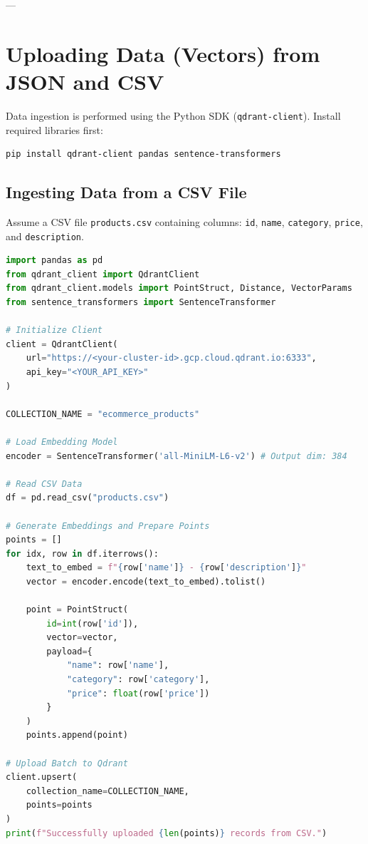 \documentclass[11pt,a4paper]{article}
\begin{document}
---

\section{Uploading Data (Vectors) from JSON and CSV}

Data ingestion is performed using the Python SDK (\texttt{qdrant-client}). Install required libraries first:
\begin{lstlisting}[language=bash]
pip install qdrant-client pandas sentence-transformers
\end{lstlisting}

\subsection{Ingesting Data from a CSV File}

Assume a CSV file \texttt{products.csv} containing columns: \texttt{id}, \texttt{name}, \texttt{category}, \texttt{price}, and \texttt{description}.

\begin{lstlisting}[language=Python, caption=Upload CSV Vectors to Qdrant]
import pandas as pd
from qdrant_client import QdrantClient
from qdrant_client.models import PointStruct, Distance, VectorParams
from sentence_transformers import SentenceTransformer

# Initialize Client
client = QdrantClient(
    url="https://<your-cluster-id>.gcp.cloud.qdrant.io:6333",
    api_key="<YOUR_API_KEY>"
)

COLLECTION_NAME = "ecommerce_products"

# Load Embedding Model
encoder = SentenceTransformer('all-MiniLM-L6-v2') # Output dim: 384

# Read CSV Data
df = pd.read_csv("products.csv")

# Generate Embeddings and Prepare Points
points = []
for idx, row in df.iterrows():
    text_to_embed = f"{row['name']} - {row['description']}"
    vector = encoder.encode(text_to_embed).tolist()
    
    point = PointStruct(
        id=int(row['id']),
        vector=vector,
        payload={
            "name": row['name'],
            "category": row['category'],
            "price": float(row['price'])
        }
    )
    points.append(point)

# Upload Batch to Qdrant
client.upsert(
    collection_name=COLLECTION_NAME,
    points=points
)
print(f"Successfully uploaded {len(points)} records from CSV.")
\end{lstlisting}
\end{document}
